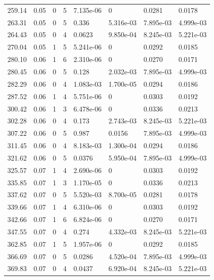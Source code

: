 \documentclass[preview]{standalone}
\begin{document}
{{{\begin{tabular}{L{1.2cm}C{1.2cm} C{0.3cm}C{0.5cm} C{1.4cm}C{1.4cm} C{1.4cm}C{1.4cm}}
  259.14  &  0.05  & 0     &  5 &  7.135e-06  & 0  & 0.0281 &  0.0178   \\ 
  263.31  &  0.05  & 0     &  5 &  0.336  & 5.316e-03  & 7.895e-03 &  4.999e-03   \\ 
  264.43  &  0.05  & 0     &  4 &  0.0623  & 9.850e-04  & 8.245e-03 &  5.221e-03   \\ 
  270.04  &  0.05  & 1     &  5 &  5.241e-06  & 0  & 0.0292 &  0.0185   \\ 
  280.10  &  0.06  & 1     &  6 &  2.310e-06  & 0  & 0.0270 &  0.0171   \\ 
  280.45  &  0.06  & 0     &  5 &  0.128  & 2.032e-03  & 7.895e-03 &  4.999e-03   \\ 
  282.29  &  0.06  & 0     &  4 &  1.083e-03  & 1.700e-05  & 0.0294 &  0.0186   \\ 
  287.52  &  0.06  & 1     &  4 &  5.751e-06  & 0  & 0.0303 &  0.0192   \\ 
  300.42  &  0.06  & 1     &  3 &  6.478e-06  & 0  & 0.0336 &  0.0213   \\ 
  302.28  &  0.06  & 0     &  4 &  0.173  & 2.743e-03  & 8.245e-03 &  5.221e-03   \\ 
  307.22  &  0.06  & 0     &  5 &  0.987  & 0.0156  & 7.895e-03 &  4.999e-03   \\ 
  311.45  &  0.06  & 0     &  4 &  8.183e-03  & 1.300e-04  & 0.0294 &  0.0186   \\ 
  321.62  &  0.06  & 0     &  5 &  0.0376  & 5.950e-04  & 7.895e-03 &  4.999e-03   \\ 
  325.57  &  0.07  & 1     &  4 &  2.690e-06  & 0  & 0.0303 &  0.0192   \\ 
  335.85  &  0.07  & 1     &  3 &  1.170e-05  & 0  & 0.0336 &  0.0213   \\ 
  337.62  &  0.07  & 0     &  5 &  5.520e-03  & 8.700e-05  & 0.0281 &  0.0178   \\ 
  339.66  &  0.07  & 1     &  4 &  6.310e-06  & 0  & 0.0303 &  0.0192   \\ 
  342.66  &  0.07  & 1     &  6 &  6.824e-06  & 0  & 0.0270 &  0.0171   \\ 
  347.55  &  0.07  & 0     &  4 &  0.274  & 4.332e-03  & 8.245e-03 &  5.221e-03   \\ 
  362.85  &  0.07  & 1     &  5 &  1.957e-06  & 0  & 0.0292 &  0.0185   \\ 
  366.69  &  0.07  & 0     &  5 &  0.0286  & 4.520e-04  & 7.895e-03 &  4.999e-03   \\ 
  369.83  &  0.07  & 0     &  4 &  0.0437  & 6.920e-04  & 8.245e-03 &  5.221e-03   \\ 

\end{tabular}}}}
\end{document}

